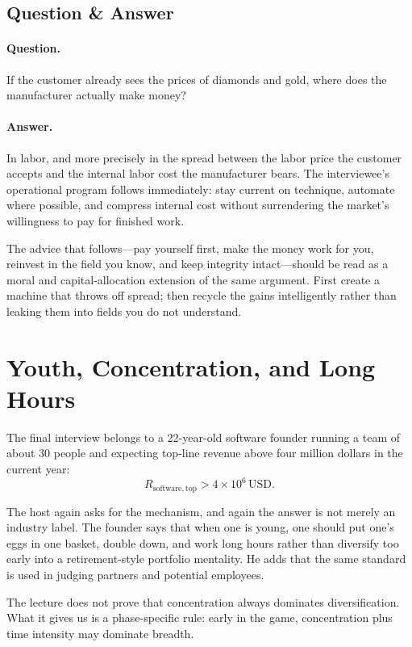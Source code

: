 \subsection{Question \& Answer}

\paragraph{Question.} If the customer already sees the prices of diamonds and gold, where does the manufacturer actually make money?

\paragraph{Answer.} In labor, and more precisely in the spread between the labor price the customer accepts and the internal labor cost the manufacturer bears. The interviewee's operational program follows immediately: stay current on technique, automate where possible, and compress internal cost without surrendering the market's willingness to pay for finished work.

The advice that follows---pay yourself first, make the money work for you, reinvest in the field you know, and keep integrity intact---should be read as a moral and capital-allocation extension of the same argument. First create a machine that throws off spread; then recycle the gains intelligently rather than leaking them into fields you do not understand.

\section{Youth, Concentration, and Long Hours}

The final interview belongs to a 22-year-old software founder running a team of about 30 people and expecting top-line revenue above four million dollars in the current year:
\begin{equation}
R_{\mathrm{software},\mathrm{top}} > 4\times 10^6 \,\mathrm{USD}.
\end{equation}

The host again asks for the mechanism, and again the answer is not merely an industry label. The founder says that when one is young, one should put one's eggs in one basket, double down, and work long hours rather than diversify too early into a retirement-style portfolio mentality. He adds that the same standard is used in judging partners and potential employees.

\begin{remark}
The lecture does not prove that concentration always dominates diversification. What it gives us is a phase-specific rule: early in the game, concentration plus time intensity may dominate breadth.
\end{remark}

